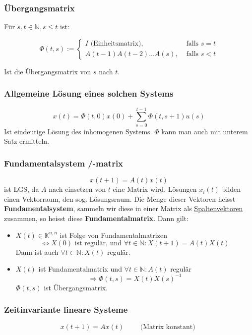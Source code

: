 \documentclass[a4paper]{article}
\newcommand{\N}{\mathbb{N}}
\begin{document}
\subsubsection{Übergangsmatrix}

Für $s, t \in \N, s \leq t$ ist:

\[
	\Phi(t, s) := 
	\begin{cases}
		I \text{ (Einheitsmatrix)}, 
		& \text{ falls } s = t \\
		A(t-1) A(t-2) ... A(s),
		& \text{ falls } s < t
	\end{cases}
\] 

Ist die Übergangsmatrix von $s$ nach $t$.
\\

\subsubsection*{Allgemeine Lösung eines solchen Systems}
\[
	x(t) = \Phi (t, 0) x(0)
	+
	\sum_{s=0}^{t-1} \Phi (t, s+1) u(s)
\] 
Ist eindeutige Lösung des inhomogenen Systems.
$\Phi$ kann man auch mit unterem Satz ermitteln.

\subsubsection{Fundamentalsystem /-matrix}
\[
	x(t+1) = A(t) x(t)
\] 
ist LGS, da $A$ nach einsetzen von $t$ eine Matrix wird.
Lösungen $x_i (t)$ bilden einen Vektorraum, den sog.
Lösungsraum. Die Menge dieser Vektoren heisst \textbf{Fundamentalsystem},
sammeln wir diese in einer Matrix als \underline{Spaltenvektoren}
zusammen, so heisst diese \textbf{Fundamentalmatrix}.
Dann gilt:
\begin{itemize}
	\item $X(t) \in \mathbb{K} ^{n,n}$ ist Folge von Fundamentalmatrizen
		\[
			\Leftrightarrow X(0) \text{ ist regulär, und }
			\forall t \in \mathbb{N}:
			X(t+1) = A(t) X(t)
		\] 
		Dann ist auch $\forall t \in \mathbb{N}: X(t)$ regulär.
	\item $X(t)$ ist Fundamentalmatrix und
		$\forall t \in \mathbb{N}: A(t)$ regulär
		\[
			\Rightarrow \Phi (t, s) = X(t) X(s) ^{-1}
		\] 
		$\Phi (t,s)$ ist Übergangsmatrix.
\end{itemize}

\subsubsection{Zeitinvariante lineare Systeme}
\[
	x(t+1) = A x(t)
	\qquad \text{ (Matrix konstant) }
\] 
\end{document}
